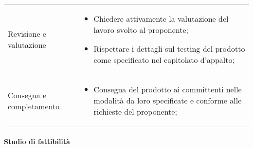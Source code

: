 {\begin{longtable}{ C{4cm} C{12cm}}
	Revisione e valutazione & \begin{itemize} \item Chiedere attivamente la valutazione del lavoro svolto al proponente; \item Rispettare i dettagli sul testing del prodotto come specificato nel capitolato d'appalto; \end{itemize}\\	
	Consegna e completamento & \begin{itemize} \item Consegna del prodotto ai committenti nelle modalità da loro specificate e conforme alle richieste del proponente; \end{itemize}\\
\end{longtable}
}
\paragraph{Studio di fattibilità} \mbox{}


